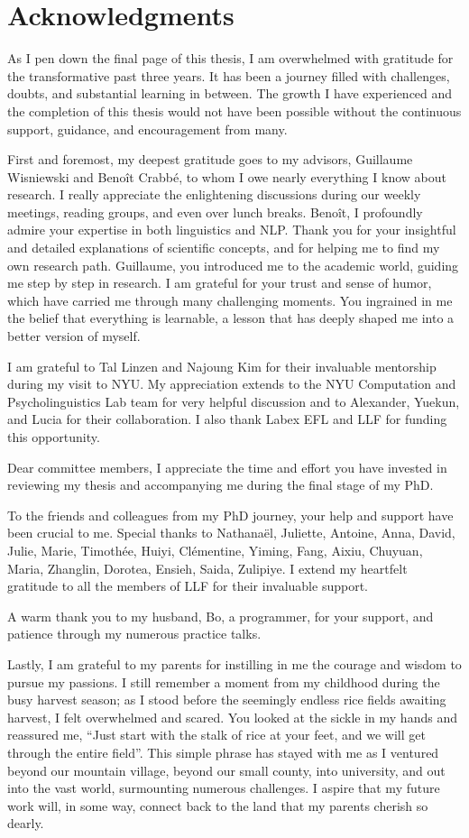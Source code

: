 \chapter*{Acknowledgments}

As I pen down the final page of this thesis, I am overwhelmed with gratitude for the transformative past three years. It has been a journey filled with challenges, doubts, and substantial learning in between. The growth I have experienced and the completion of this thesis would not have been possible without the continuous support, guidance, and encouragement from many.

First and foremost, my deepest gratitude goes to my advisors, Guillaume Wisniewski and Benoît Crabbé, to whom I owe nearly everything I know about research. I really appreciate the enlightening discussions during our weekly meetings, reading groups, and even over lunch breaks. Benoît, I profoundly admire your expertise in both linguistics and NLP. Thank you for your insightful and detailed explanations of scientific concepts, and for helping me to find my own research path. Guillaume, you introduced me to the academic world, guiding me step by step in research. I am grateful for your trust and sense of humor, which have carried me through many challenging moments. You ingrained in me the belief that everything is learnable, a lesson that has deeply shaped me into a better version of myself. 

I am grateful to Tal Linzen and Najoung Kim for their invaluable mentorship during my visit to NYU. My appreciation extends to the NYU Computation and Psycholinguistics Lab team for very helpful discussion and to Alexander, Yuekun, and Lucia for their collaboration. I also thank Labex EFL and LLF for funding this opportunity.

Dear committee members, I appreciate the time and effort you have invested in reviewing my thesis and accompanying me during the final stage of my PhD.

To the friends and colleagues from my PhD journey, your help and support have been crucial to me. Special thanks to Nathanaël, Juliette, Antoine, Anna, David, Julie, Marie, Timothée, Huiyi, Clémentine, Yiming, Fang, Aixiu, Chuyuan, Maria, Zhanglin, Dorotea, Ensieh, Saida, Zulipiye. I extend my heartfelt gratitude to all the members of LLF for their invaluable support.

A warm thank you to my husband, Bo, a programmer, for your support, and patience through my numerous practice talks. 

Lastly, I am grateful to my parents for instilling in me the courage and wisdom to pursue my passions. I still remember a moment from my childhood during the busy harvest season; as I stood before the seemingly endless rice fields awaiting harvest, I felt overwhelmed and scared. You looked at the sickle in my hands and reassured me, ``Just start with the stalk of rice at your feet, and we will get through the entire field''. This simple phrase has stayed with me as I ventured beyond our mountain village, beyond our small county, into university, and out into the vast world, surmounting numerous challenges. I aspire that my future work will, in some way, connect back to the land that my parents cherish so dearly. 